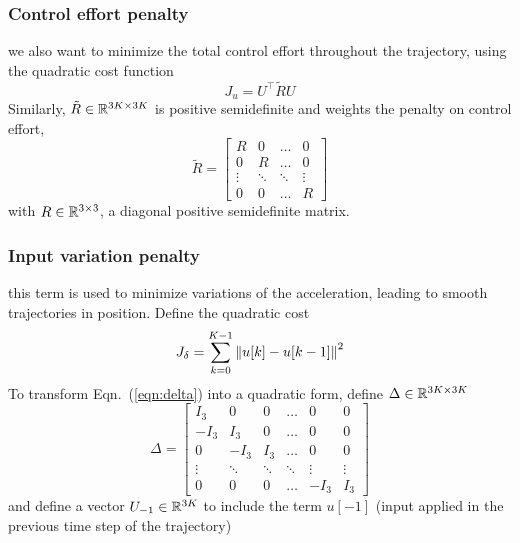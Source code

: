 \subsubsection{Control effort penalty}
we also want to minimize the total control effort throughout the trajectory, using the quadratic cost function
\begin{equation}
\label{eqn:input}
J_u = U^\top \tilde{R} U 
\end{equation}
Similarly, $\tilde{R} \in {\mathbb R}^{3K \times 3K} $ is positive semidefinite and weights the penalty on control effort,
\begin{equation}
\tilde{R} = \begin{bmatrix}
R & 0& \ldots & 0 \\
0 & R & \ldots & 0 \\
\vdots & \ddots & \ddots & \vdots \\
0 & 0 & \ldots & R
\end{bmatrix}
\end{equation}
with $R \in {\mathbb R}^{3 \times 3}$, a diagonal positive semidefinite matrix.

\subsubsection{Input variation penalty}
this term is used to minimize variations of the acceleration, leading to smooth trajectories in position. Define the quadratic cost
\begin{equation}
\label{eqn:delta}
J_\delta = \sum_{k=0}^{K-1}\left\Vert u[k]-u[k-1]\right\Vert^2
\end{equation}
To transform Eqn.~(\ref{eqn:delta}) into a quadratic form, define $\Delta \in {\mathbb R}^{3K \times 3K}$
\begin{equation}
\Delta = \begin{bmatrix}
I_3 & 0 & 0 & \ldots & 0 & 0 \\
-I_3 & I_3 & 0 & \dots & 0 & 0 \\
0 & -I_3 & I_3 & \ldots & 0 & 0 \\
\vdots & \ddots & \ddots & \ddots & \vdots & \vdots\\
0& 0 & 0 & \ldots & -I_3 & I_3
\end{bmatrix}
\end{equation}
and define a vector $U_{-1} \in {\mathbb R}^{3K}$ to include the term $u[-1]$ (input applied in the previous time step of the trajectory)


